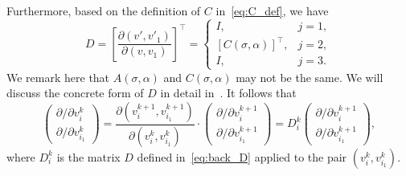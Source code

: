 \documentclass[12pt,nopreprintline]{elsarticle}
\begin{document}
Furthermore, based on the definition of $C$ in~\eqref{eq:C_def}, we have
\begin{equation} \label{eq:back_D}
    D =  \left[ \dfrac{\partial (v',v'_{1})}{\partial (v,v_1)} \right]^\top = \begin{cases}
    I,  & j=1, \\
    [C(\sigma, \alpha)]^\top , & j=2,\\
    I, & j=3.
    \end{cases}
\end{equation}
We remark here that $A(\sigma, \alpha)$ and $C(\sigma, \alpha)$ may not be the same. We will discuss the concrete form of $D$ in detail in~.
It follows that 
\begin{equation}\label{backPropagation}
 \begin{pmatrix}
\partial/\partial v_i^{k}\\
\partial/\partial v_{i_1}^{k}
\end{pmatrix}
=  \frac{\partial (v_i^{k+1},v_{i_1}^{k+1})}{\partial (v_i^{k},v_{i_1}^{k})} \cdot 
 \begin{pmatrix}
\partial/\partial v_i^{k+1}\\
\partial/\partial v_{i_1}^{k+1}
\end{pmatrix}
 =  D_i^k  
 \begin{pmatrix}
\partial/\partial v_i^{k+1}\\
\partial/\partial v_{i_1}^{k+1}
\end{pmatrix},
\end{equation}
where $D_i^k$ is the matrix $D$ defined in~\eqref{eq:back_D} applied to the pair $(v_i^k, v_{i_1}^k)$.
\end{document}

